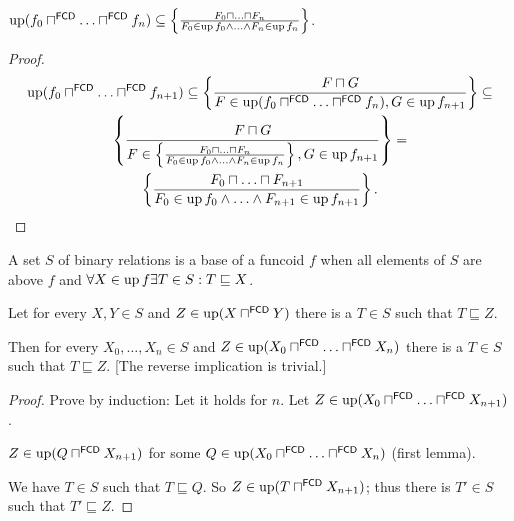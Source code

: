 \begin{cor}
$\operatorname{up} (f_0 \sqcap^{\mathsf{FCD}} \ldots
\sqcap^{\mathsf{FCD}} f_n) \subseteq \left\{ \frac{ F_0 \sqcap \ldots \sqcap
F_n }{ F_0 \in \operatorname{up} f_0 \wedge \ldots \wedge F_n \in \operatorname{up} f_n }\right\}$.
\end{cor}

\begin{proof}
~
\begin{multline*}
\operatorname{up} (f_0 \sqcap^{\mathsf{FCD}} \ldots
\sqcap^{\mathsf{FCD}} f_{n + 1}) \subseteq \left\{ \frac{ F \sqcap G
}{ F \in \operatorname{up} (f_0 \sqcap^{\mathsf{FCD}}
\ldots \sqcap^{\mathsf{FCD}} f_n), G \in \operatorname{up} f_{n + 1} }\right\} \subseteq \\
\left\{ \frac{ F \sqcap G }{ F \in \left\{ \frac{ F_0
\sqcap \ldots \sqcap F_n }{ F_0 \in \operatorname{up} f_0
\wedge \ldots \wedge F_n \in \operatorname{up} f_n }\right\}, G \in \operatorname{up} f_{n + 1} }\right\} = \\
\left\{ \frac{ F_0 \sqcap \ldots \sqcap F_{n + 1} }{
F_0 \in \operatorname{up} f_0 \wedge \ldots \wedge F_{n + 1} \in
\operatorname{up} f_{n + 1} }\right\}.
\end{multline*}
\end{proof}


\begin{defn}
  A set $S$ of binary relations is a base of a funcoid $f$ when all elements
  of $S$ are above $f$ and $\forall X \in \operatorname{up} f \exists T \in S : T
  \sqsubseteq X$.
\end{defn}

\begin{lem}
  Let for every $X, Y \in S$ and $Z \in \operatorname{up} (X
  \sqcap^{\mathsf{FCD}} Y)$ there is a $T \in S$ such that $T
  \sqsubseteq Z$.
  
  Then for every $X_0, \ldots, X_n \in S$ and $Z \in \operatorname{up} (X_0
  \sqcap^{\mathsf{FCD}} \ldots \sqcap^{\mathsf{FCD}} X_n)$ there
  is a $T \in S$ such that $T \sqsubseteq Z$. [The reverse implication is
  trivial.]
\end{lem}

\begin{proof}
Prove by induction: Let it holds for $n$. Let $Z \in \operatorname{up} (X_0
\sqcap^{\mathsf{FCD}} \ldots \sqcap^{\mathsf{FCD}} X_{n + 1})$.

$Z \in \operatorname{up} (Q \sqcap^{\mathsf{FCD}} X_{n + 1})$ for some $Q \in
\operatorname{up} (X_0 \sqcap^{\mathsf{FCD}} \ldots
\sqcap^{\mathsf{FCD}} X_n)$ (first lemma).

We have $T \in S$ such that $T \sqsubseteq Q$. So $Z \in \operatorname{up} (T
\sqcap^{\mathsf{FCD}} X_{n + 1})$; thus there is $T' \in S$ such that
$T' \sqsubseteq Z$.
\end{proof}

